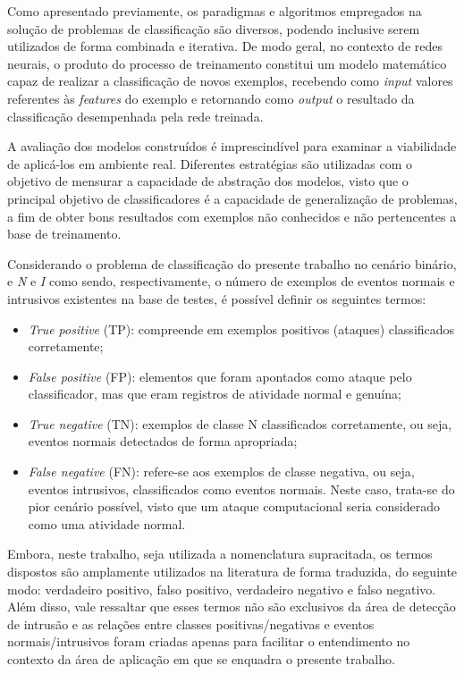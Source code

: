 Como apresentado previamente, os paradigmas e algoritmos empregados na solução de problemas de classificação são diversos, podendo inclusive serem utilizados de forma combinada e iterativa. De modo geral, no contexto de redes neurais, o produto do processo de treinamento constitui um modelo matemático capaz de realizar a classificação de novos exemplos, recebendo como \textit{input} valores referentes às \textit{features} do exemplo e retornando como \textit{output} o resultado da classificação desempenhada pela rede treinada.

A avaliação dos modelos construídos é imprescindível para examinar a viabilidade de aplicá-los em ambiente real. Diferentes estratégias são utilizadas com o objetivo de mensurar a capacidade de abstração dos modelos, visto que o principal objetivo de classificadores é a capacidade de generalização de problemas, a fim de obter bons resultados com exemplos não conhecidos e não pertencentes a base de treinamento.

Considerando o problema de classificação do presente trabalho no cenário binário, e \textit{N} e \textit{I} como sendo, respectivamente, o número de exemplos de eventos normais e intrusivos existentes na base de testes, é possível definir os seguintes termos:

\begin{itemize}
    \item \textit{True positive} (TP): compreende em exemplos positivos (ataques) classificados corretamente;
    \item \textit{False positive} (FP): elementos que foram apontados como ataque pelo classificador, mas que eram registros de atividade normal e genuína;
    \item \textit{True negative} (TN): exemplos de classe N classificados corretamente, ou seja, eventos normais detectados de forma apropriada;
    \item \textit{False negative} (FN): refere-se aos exemplos de classe negativa, ou seja, eventos intrusivos, classificados como eventos normais. Neste caso, trata-se do pior cenário possível, visto que um ataque computacional seria considerado como uma atividade normal.
\end{itemize}

Embora, neste trabalho, seja utilizada a nomenclatura supracitada, os termos dispostos são amplamente utilizados na literatura de forma traduzida, do seguinte modo: verdadeiro positivo, falso positivo, verdadeiro negativo e falso negativo. Além disso, vale ressaltar que esses termos não são exclusivos da área de detecção de intrusão e as relações entre classes positivas/negativas e eventos normais/intrusivos foram criadas apenas para facilitar o entendimento no contexto da área de aplicação em que se enquadra o presente trabalho.

